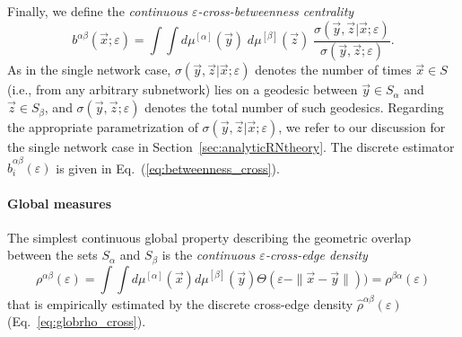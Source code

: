 Finally, we define the \textit{continuous $\varepsilon$-cross-betweenness centrality}
\begin{equation}
b^{\alpha\beta}(\vec{x};\varepsilon)=\int \int d\mu^{[\alpha]}(\vec{y})\; d\mu^{[\beta]}(\vec{z})\; \frac{\sigma(\vec{y},\vec{z}|\vec{x};\varepsilon)}{\sigma(\vec{y},\vec{z};\varepsilon)}.
\end{equation}
\noindent
As in the single network case, $\sigma(\vec{y},\vec{z}|\vec{x};\varepsilon)$ denotes the number of times $\vec{x}\in S$ (i.e., from any arbitrary subnetwork) lies on a geodesic between $\vec{y}\in S_\alpha$ and $\vec{z}\in S_\beta$, and $\sigma(\vec{y},\vec{z};\varepsilon)$ denotes the total number of such geodesics. Regarding the appropriate parametrization of $\sigma(\vec{y},\vec{z}|\vec{x};\varepsilon)$, we refer to our discussion for the single network case in Section~\ref{sec:analyticRNtheory}. The discrete estimator $\hat{b}_i^{\alpha\beta}(\varepsilon)$ is given in Eq.~(\ref{eq:betweenness_cross}).


\paragraph{Global measures}

The simplest continuous global property describing the geometric overlap between the sets $S_\alpha$ and $S_\beta$ is the \textit{continuous $\varepsilon$-cross-edge density}
\begin{equation}
\rho^{\alpha\beta}(\varepsilon) = \int\!\!\!\int d\mu^{[\alpha]}(\vec{x}) d\mu^{[\beta]}(\vec{y}) \Theta(\varepsilon - \|\vec{x} - \vec{y}\|)) = \rho^{\beta\alpha}(\varepsilon)
\end{equation}
that is empirically estimated by the discrete cross-edge density $\hat{\rho}^{\alpha\beta}(\varepsilon)$ (Eq.~\ref{eq:globrho_cross}).

